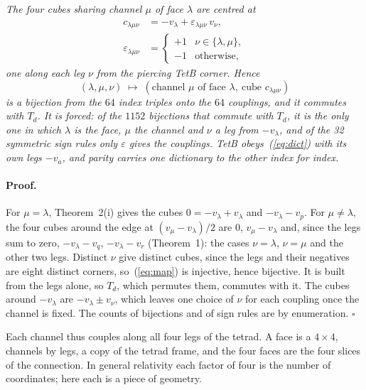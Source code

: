 \documentclass[twocolumn]{iopjournal}
\begin{document}
\emph{The four cubes sharing channel $\mu$ of face $\lambda$ are
centred at}
\begin{equation}
\begin{aligned}
  c_{\lambda\mu\nu} &= -v_\lambda + \varepsilon_{\lambda\mu\nu}\,v_\nu,\\
  \varepsilon_{\lambda\mu\nu} &=
  \begin{cases} +1 & \nu \in \{\lambda, \mu\},\\ -1 & \text{otherwise,}\end{cases}
\end{aligned}
  \label{eq:dict}
\end{equation}
\emph{one along each leg $\nu$ from the piercing TetB corner. Hence}
\begin{equation}
  (\lambda, \mu, \nu) \;\longmapsto\;
  (\text{channel } \mu \text{ of face } \lambda,\ \text{cube } c_{\lambda\mu\nu})
  \label{eq:map}
\end{equation}
\emph{is a bijection from the $64$ index triples onto the $64$
couplings, and it commutes with $T_d$. It is forced: of the $1152$
bijections that commute with $T_d$, it is the only one in which
$\lambda$ is the face, $\mu$ the channel and $\nu$ a leg from
$-v_\lambda$, and of the 32 symmetric sign rules only
$\varepsilon$ gives the couplings. TetB obeys~(\ref{eq:dict}) with its
own legs $-v_a$, and parity carries one dictionary to the other index
for index.}

\paragraph{Proof.} For $\mu = \lambda$, Theorem~2(i) gives the cubes
$0 = -v_\lambda + v_\lambda$ and $-v_\lambda - v_p$. For
$\mu \ne \lambda$, the four cubes around the edge at
$(v_\mu - v_\lambda)/2$ are $0$, $v_\mu - v_\lambda$ and, since
the legs sum to zero, $-v_\lambda - v_q$, $-v_\lambda - v_r$
(Theorem~1): the cases
$\nu = \lambda$, $\nu = \mu$ and the other two legs. Distinct $\nu$
give distinct cubes, since the legs and their negatives are eight
distinct corners, so~(\ref{eq:map}) is injective, hence bijective.
It is built from the legs alone, so $T_d$, which permutes them,
commutes with it. The cubes around $-v_\lambda$ are
$-v_\lambda \pm v_\nu$, which leaves one choice of $\nu$ for each
coupling once the channel is fixed. The counts of bijections and of
sign rules are by enumeration. \hfill $\square$

\medskip\noindent
Each channel thus couples along all four legs of the tetrad. A face
is a $4 \times 4$, channels by legs, a copy of the tetrad frame, and
the four faces are the four slices of the connection. In general
relativity each factor of four is the number of coordinates; here
each is a piece of geometry.
\end{document}
